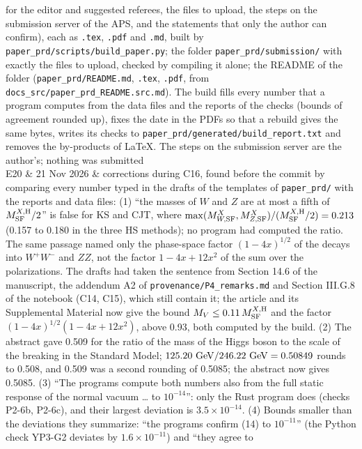 \documentclass[
  10pt,
]{article}
\begin{document}
\begin{longtable}[]
for the editor and suggested referees, the files to upload, the steps on
the submission server of the APS, and the statements that only the
author can confirm), each as \texttt{.tex}, \texttt{.pdf} and
\texttt{.md}, built by \texttt{paper\_prd/scripts/build\_paper.py}; the
folder \texttt{paper\_prd/submission/} with exactly the files to upload,
checked by compiling it alone; the README of the folder
(\texttt{paper\_prd/README.md}, \texttt{.tex}, \texttt{.pdf}, from
\texttt{docs\_src/paper\_prd\_README.src.md}). The build fills every
number that a program computes from the data files and the reports of
the checks (bounds of agreement rounded up), fixes the date in the PDFs
so that a rebuild gives the same bytes, writes its checks to
\texttt{paper\_prd/generated/build\_report.txt} and removes the
by-products of LaTeX. The steps on the submission server are the
author's; nothing was submitted \\
E20 & 21 Nov 2026 & corrections during C16, found before the commit by
comparing every number typed in the drafts of the templates of
\texttt{paper\_prd/} with the reports and data files: (1) ``the masses
of \(W\) and \(Z\) are at most a fifth of \(M^{X,{\rm H}}_{\rm SF}/2\)''
is false for KS and CJT, where
\(\max(M^X_{W,{\rm SF}},M^X_{Z,{\rm SF}})/(M^{X,{\rm H}}_{\rm SF}/2)=0.213\)
(0.157 to 0.180 in the three HS methods); no program had computed the
ratio. The same passage named only the phase-space factor
\((1-4x)^{1/2}\) of the decays into \(W^+W^-\) and \(ZZ\), not the
factor \(1-4x+12x^2\) of the sum over the polarizations. The drafts had
taken the sentence from Section 14.6 of the manuscript, the addendum A2
of \texttt{provenance/P4\_remarks.md} and Section III.G.8 of the
notebook (C14, C15), which still contain it; the article and its
Supplemental Material now give the bound
\(M_V\le0.11\,M^{X,{\rm H}}_{\rm SF}\) and the factor
\((1-4x)^{1/2}(1-4x+12x^2)\), above 0.93, both computed by the build.
(2) The abstract gave 0.509 for the ratio of the mass of the Higgs boson
to the scale of the breaking in the Standard Model;
\(125.20\ {\rm GeV}/246.22\ {\rm GeV}=0.50849\) rounds to 0.508, and
0.509 was a second rounding of 0.5085; the abstract now gives 0.5085.
(3) ``The programs compute both numbers also from the full static
response of the normal vacuum \ldots{} to \(10^{-14}\)'': only the Rust
program does (checks P2-6b, P2-6c), and their largest deviation is
\(3.5\times10^{-14}\). (4) Bounds smaller than the deviations they
summarize: ``the programs confirm (14) to \(10^{-11}\)'' (the Python
check YP3-G2 deviates by \(1.6\times10^{-11}\)) and ``they agree to

\end{longtable}
\end{document}
